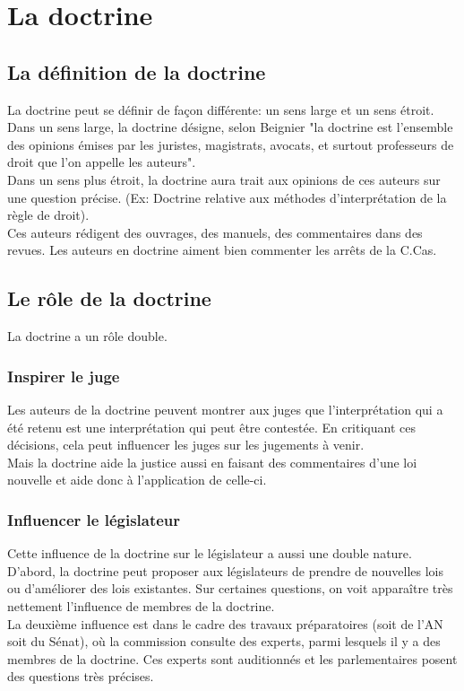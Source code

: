 \chapter{La doctrine}

\section{La définition de la doctrine}

La doctrine peut se définir de façon différente: un sens large et un sens étroit. \\
Dans un sens large, la doctrine désigne, selon Beignier "la doctrine est l'ensemble des opinions émises par les juristes, magistrats, avocats, et surtout professeurs de droit que l'on appelle les auteurs". \\
Dans un sens plus étroit, la doctrine aura trait aux opinions de ces auteurs sur une question précise. (Ex: Doctrine relative aux méthodes d'interprétation de la règle de droit). \\
Ces auteurs rédigent des ouvrages, des manuels, des commentaires dans des revues. Les auteurs en doctrine aiment bien commenter les arrêts de la C.Cas.

\section{Le rôle de la doctrine}

La doctrine a un rôle double.

\subsection{Inspirer le juge}

Les auteurs de la doctrine peuvent montrer aux juges que l'interprétation qui a été retenu est une interprétation qui peut être contestée. En critiquant ces décisions, cela peut influencer les juges sur les jugements à venir. \\ 
Mais la doctrine aide la justice aussi en faisant des commentaires d'une loi nouvelle et aide donc à l'application de celle-ci. 

\subsection{Influencer le législateur}

Cette influence de la doctrine sur le législateur a aussi une double nature. \\
D'abord, la doctrine peut proposer aux législateurs de prendre de nouvelles lois ou d'améliorer des lois existantes. Sur certaines questions, on voit apparaître très nettement l'influence de membres de la doctrine. \\
La deuxième influence est dans le cadre des travaux préparatoires (soit de l'AN soit du Sénat), où la commission consulte des experts, parmi lesquels il y a des membres de la doctrine. Ces experts sont auditionnés et les parlementaires posent des questions très précises.


